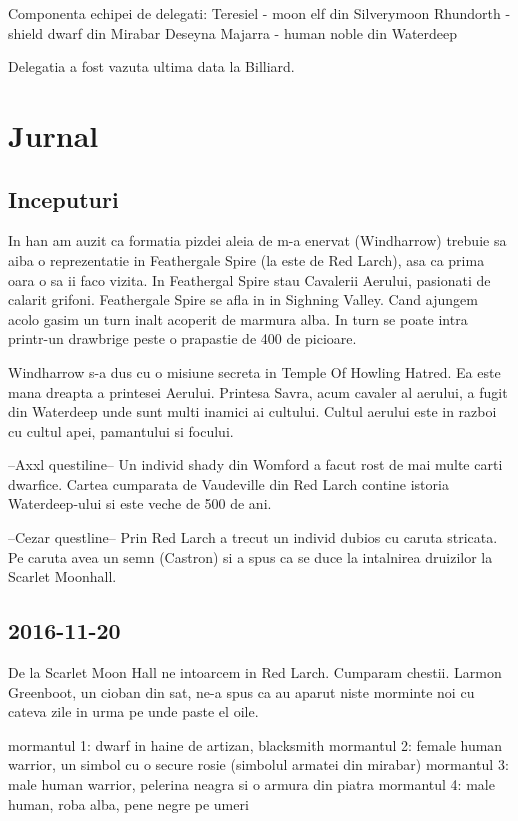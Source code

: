 \documentclass[12pt,twoside]{book}
\begin{document}
Componenta echipei de delegati:
Teresiel - moon elf din Silverymoon
Rhundorth - shield dwarf din Mirabar
Deseyna Majarra - human noble din Waterdeep

Delegatia a fost vazuta ultima data la Billiard.

\newpage

\chapter{Jurnal}

\section{Inceputuri}


In han am auzit ca formatia pizdei aleia de m-a enervat (Windharrow) trebuie sa aiba o reprezentatie in Feathergale Spire (la este de Red Larch), asa ca prima oara o sa ii faco vizita. In Feathergal Spire stau
Cavalerii Aerului, pasionati de calarit grifoni. Feathergale Spire se afla in in Sighning Valley.
Cand ajungem acolo gasim un turn inalt acoperit de marmura alba. In turn se poate intra
printr-un drawbrige peste o prapastie de 400 de picioare.


Windharrow s-a dus cu o misiune secreta in Temple Of Howling Hatred. Ea este mana dreapta
a printesei Aerului. Printesa Savra, acum cavaler al aerului, a fugit din Waterdeep unde sunt multi inamici ai
cultului.
Cultul aerului este in razboi cu cultul apei, pamantului si focului.


--Axxl questiline--
Un individ shady din Womford a facut rost de mai multe carti dwarfice. Cartea
cumparata de Vaudeville din Red Larch contine istoria Waterdeep-ului si este veche 
de 500 de ani.


--Cezar questline--
Prin Red Larch a trecut un individ dubios cu caruta stricata. Pe caruta avea 
un semn (Castron) si a spus ca se duce la intalnirea druizilor la Scarlet Moonhall.

\section{2016-11-20}

De la Scarlet Moon Hall ne intoarcem in Red Larch. Cumparam
chestii. Larmon Greenboot, un cioban din sat, ne-a spus ca au aparut niste 
morminte noi cu cateva zile in urma pe unde paste el oile.

mormantul 1: dwarf in haine de artizan, blacksmith
mormantul 2: female human warrior, un simbol cu o 
	     secure rosie (simbolul armatei din mirabar)
mormantul 3: male human warrior, pelerina neagra si o armura din piatra
mormantul 4: male human, roba alba, pene negre pe umeri
\end{document}
